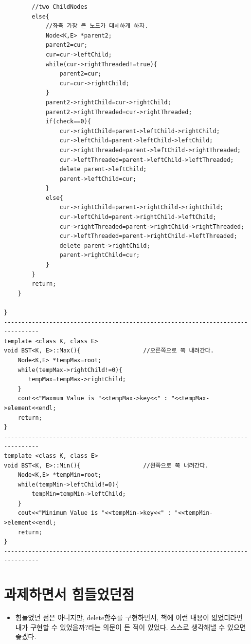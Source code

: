 \documentclass[a4paper,11pt]{article}
\begin{document}
\begin{Verbatim}
        //two ChildNodes
        else{
            //좌측 가장 큰 노드가 대체하게 하자.
            Node<K,E> *parent2;
            parent2=cur;
            cur=cur->leftChild;
            while(cur->rightThreaded!=true){
                parent2=cur;
                cur=cur->rightChild;
            }
            parent2->rightChild=cur->rightChild;
            parent2->rightThreaded=cur->rightThreaded;
            if(check==0){
                cur->rightChild=parent->leftChild->rightChild; 
                cur->leftChild=parent->leftChild->leftChild;
                cur->rightThreaded=parent->leftChild->rightThreaded;
                cur->leftThreaded=parent->leftChild->leftThreaded;
                delete parent->leftChild;
                parent->leftChild=cur;
            }
            else{
                cur->rightChild=parent->rightChild->rightChild; 
                cur->leftChild=parent->rightChild->leftChild;
                cur->rightThreaded=parent->rightChild->rightThreaded;
                cur->leftThreaded=parent->rightChild->leftThreaded;
                delete parent->rightChild;
                parent->rightChild=cur;
            }
        }
        return;
    }

}
--------------------------------------------------------------------------------
template <class K, class E>
void BST<K, E>::Max(){ 					//오른쪽으로 쭉 내려간다.
    Node<K,E> *tempMax=root;
    while(tempMax->rightChild!=0){
       tempMax=tempMax->rightChild;
    }
    cout<<"Maxmum Value is "<<tempMax->key<<" : "<<tempMax->element<<endl;    
    return;
}
--------------------------------------------------------------------------------
template <class K, class E>
void BST<K, E>::Min(){ 					//왼쪽으로 쭉 내려간다.
    Node<K,E> *tempMin=root;
    while(tempMin->leftChild!=0){
        tempMin=tempMin->leftChild;
    }
    cout<<"Minimum Value is "<<tempMin->key<<" : "<<tempMin->element<<endl;  
    return;
}
--------------------------------------------------------------------------------
\end{Verbatim}
\section{과제하면서 힘들었던점}
\begin{itemize}
\item 힘들었던 점은 아니지만, delete함수를 구현하면서, 책에 이런 내용이 없었더라면 내가 구현할 수 있었을까?라는 의문이 든 적이 있었다. 스스로 생각해낼 수 있으면 좋겠다.
\end{itemize}
\end{document}
